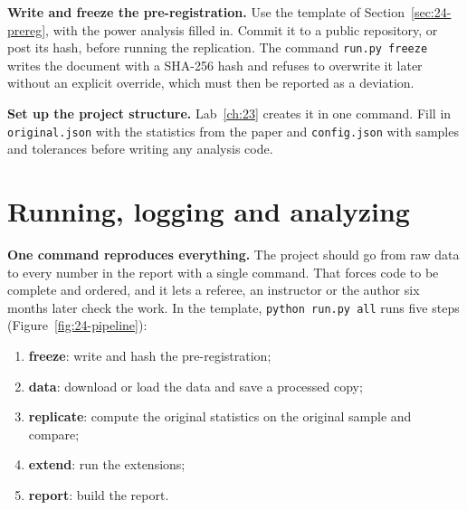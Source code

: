 \textbf{Write and freeze the pre-registration.} Use the template of Section~\ref{sec:24-prereg}, with the power analysis filled in. Commit it to a public repository, or post its hash, before running the replication. The command \texttt{run.py freeze} writes the document with a SHA-256 hash and refuses to overwrite it later without an explicit override, which must then be reported as a deviation.

{\sloppy \textbf{Set up the project structure.} Lab~\ref{ch:23} creates it in one command. Fill in \texttt{original.json} with the statistics from the paper and \texttt{config.json} with samples and tolerances before writing any analysis code.\par}

\section{Running, logging and analyzing}
\label{sec:24-running}

\textbf{One command reproduces everything.} The project should go from raw data to every number in the report with a single command. That forces code to be complete and ordered, and it lets a referee, an instructor or the author six months later check the work. In the template, \texttt{python run.py all} runs five steps (Figure~\ref{fig:24-pipeline}):

\begin{enumerate}
  \item \textbf{freeze}: write and hash the pre-registration;
  \item \textbf{data}: download or load the data and save a processed copy;
  \item \textbf{replicate}: compute the original statistics on the original sample and compare;
  \item \textbf{extend}: run the extensions;
  \item \textbf{report}: build the report.
\end{enumerate}

